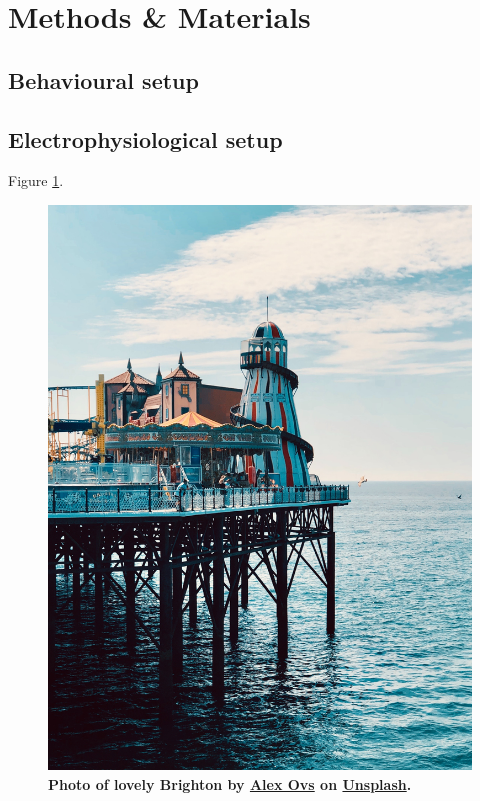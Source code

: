 \section{Methods \& Materials} \label{methods}

\subsection{Behavioural setup}
\lipsum[2]

\subsection{Electrophysiological setup}
\lipsum[2] Figure \ref{fig:setup}.

\begin{figure}
    \centering
    \includegraphics[width=\hsize]{src/figures/brighton.jpeg}
    \caption{
        \textbf{Photo of lovely Brighton by \href{https://unsplash.com/es/@sanekovs?utm_source=unsplash&utm_medium=referral&utm_content=creditCopyText"}{Alex Ovs} on \href{https://unsplash.com/s/photos/brighton?utm_source=unsplash&utm_medium=referral&utm_content=creditCopyText}{Unsplash}.
        }
        \lipsum[1]
    }
    \label{fig:setup}
\end{figure}



